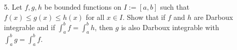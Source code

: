 \documentclass[12pt,letterpaper]{article}
\theoremstyle{case}
\theoremstyle{definition}
\begin{document}
\begin{enumerate}
\begin{enumerate}
\begin{proof}
				So $L(f,\mathcal{P}) \leq L(g,\mathcal{P})$ and
				\[U(f,\mathcal{P})=\sum_{i=1}^{n} M_{i_1} (x_i-x_{i-1}) \leq \sum_{i=1}^{n} M_{i_2}(x_i-x_{i-1})=U(g,\mathcal{P})\]
				So $U(f,\mathcal{P}) \leq U(g,\mathcal{P})$.
				\\\\Now, we have that
				\[L(f)=\sup \{L(f,\mathcal{P}): \mathcal{P} \in \mathscr{P}[a,b]\} \leq \sup \{L(g,\mathcal{P}): \mathcal{P} \in \mathscr{P}\}=L(g)\]
				And so $L(f) \leq L(g)$. Also,
				\[U(f)=\inf \{U(f,\mathcal{P}): \mathcal{P} \in \mathscr{P}\} \leq \inf \{U(g,\mathcal{P}): \mathcal{P} \in \mathscr{P}\}=U(g)\]
				And thus $U(f) \leq U(g)$.\\\\
				$\therefore$ If $f(x) \leq g(x)$, then $L(f) \leq L(g)$ and $U(f) \leq U(g)$.
			\end{proof}
			\item[5.] Let $f,g,h$ be bounded functions on $I:=[a,b]$ such that $f(x) \leq g(x) \leq h(x)$ for all $x \in I$. Show that if $f$ and $h$ are Darboux integrable and if $\displaystyle\int_{a}^{b} f=\displaystyle\int_{a}^{b} h$, then $g$ is also Darboux integrable with $\displaystyle\int_{a}^{b} g = \displaystyle\int_{a}^{b} f$.
			

\end{enumerate}
\end{enumerate}
\end{document}
